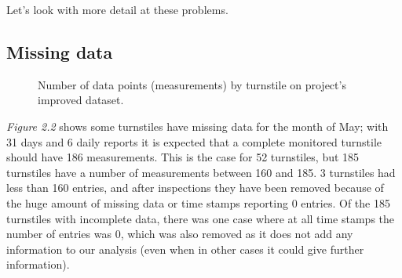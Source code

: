 \documentclass[letterpaper,10pt,english]{sphinxmanual}
\begin{document}
Let's look with more detail at these problems.


\subsection{Missing data}
\label{section1:missing-data}\begin{figure}[htbp]
\centering
\capstart

\caption{Number of data points (measurements) by turnstile on project's improved
dataset.}\label{section1:figure22}\end{figure}

\emph{Figure 2.2} shows some turnstiles have missing data for the
month of May; with 31 days and 6 daily reports it is expected that a complete
monitored turnstile should have 186 measurements. This is the case for 52 turnstiles,
but 185 turnstiles have a number of measurements between 160 and 185. 3 turnstiles
had less than 160 entries, and after inspections they have been removed because
of the huge amount of missing data or time stamps reporting 0 entries. Of the 185
turnstiles with incomplete data, there was one case where at all time stamps the
number of entries was 0, which was also removed as it does not add any information
to our analysis (even when in other cases it could give further information).
\end{document}
